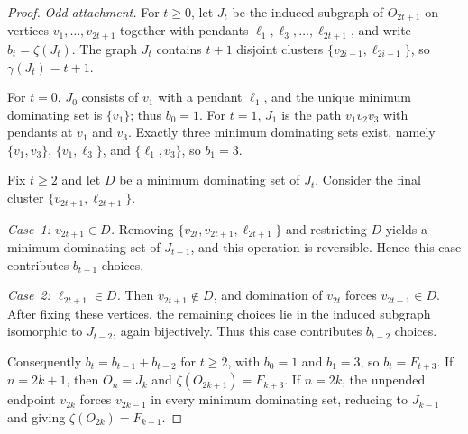 \documentclass[10pt,a4paper]{amsart}
\begin{document}
\begin{proof}
\smallskip
\noindent\emph{Odd attachment.}
For $t\ge 0$, let $J_t$ be the induced subgraph of $O_{2t+1}$ on vertices
$v_1,\dots,v_{2t+1}$ together with pendants $\ell_1,\ell_3,\dots,\ell_{2t+1}$,
and write $b_t=\zeta(J_t)$.
The graph $J_t$ contains $t+1$ disjoint clusters
$\{v_{2i-1},\ell_{2i-1}\}$, so $\gamma(J_t)=t+1$.

For $t=0$, $J_0$ consists of $v_1$ with a pendant $\ell_1$, and the unique minimum
dominating set is $\{v_1\}$; thus $b_0=1$.
For $t=1$, $J_1$ is the path $v_1v_2v_3$ with pendants at $v_1$ and $v_3$.
Exactly three minimum dominating sets exist, namely
$\{v_1,v_3\}$, $\{v_1,\ell_3\}$, and $\{\ell_1,v_3\}$, so $b_1=3$.

Fix $t\ge 2$ and let $D$ be a minimum dominating set of $J_t$.
Consider the final cluster $\{v_{2t+1},\ell_{2t+1}\}$.

\emph{Case~1: $v_{2t+1}\in D$.}
Removing $\{v_{2t},v_{2t+1},\ell_{2t+1}\}$ and restricting $D$ yields a minimum
dominating set of $J_{t-1}$, and this operation is reversible.
Hence this case contributes $b_{t-1}$ choices.

\emph{Case~2: $\ell_{2t+1}\in D$.}
Then $v_{2t+1}\notin D$, and domination of $v_{2t}$ forces $v_{2t-1}\in D$.
After fixing these vertices, the remaining choices lie in the induced subgraph
isomorphic to $J_{t-2}$, again bijectively.
Thus this case contributes $b_{t-2}$ choices.

Consequently $b_t=b_{t-1}+b_{t-2}$ for $t\ge 2$, with $b_0=1$ and $b_1=3$,
so $b_t=F_{t+3}$.
If $n=2k+1$, then $O_n=J_k$ and $\zeta(O_{2k+1})=F_{k+3}$.
If $n=2k$, the unpended endpoint $v_{2k}$ forces $v_{2k-1}$ in every minimum
dominating set, reducing to $J_{k-1}$ and giving $\zeta(O_{2k})=F_{k+1}$.
\end{proof}
\end{document}
